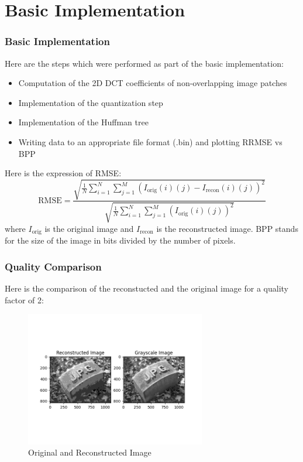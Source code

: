 \documentclass[Serif, 10pt, brown]{beamer}
\theoremstyle{example}
\theoremstyle{plain}
\begin{document}
\section{Basic Implementation}
\begin{frame}
	\frametitle{Basic Implementation}
	Here are the steps which were performed as part of the basic implementation:
	\begin{itemize}
		\item Computation of the 2D DCT coefficients of non-overlapping image patches
		\item Implementation of the quantization step
		\item Implementation of the Huffman tree
		\item Writing data to an appropriate file format (.bin) and plotting RRMSE vs BPP
	\end{itemize}
	Here is the expression of RMSE:
	\begin{equation}
		\text{RMSE} = \frac{\sqrt{\frac{1}{N} \sum_{i=1}^{N}\sum_{j=1}^{M} (I_{\text{orig}}(i)(j) - I_{\text{recon}}(i)(j))^2}}{\sqrt{\frac{1}{N} \sum_{i=1}^{N}\sum_{j=1}^{M} (I_{\text{orig}}(i)(j))^2}}
	\end{equation}
	where $I_{\text{orig}}$ is the original image and $I_{\text{recon}}$ is the reconstructed image. BPP stands for the size of the image in bits divided by the number of pixels.
\end{frame}
\begin{frame}
	\frametitle{Quality Comparison}
	Here is the comparison of the reconstucted and the original image for a quality factor of 2:
	\begin{figure}
		\centering
		\includegraphics[width=0.7\textwidth]{../results/Quality: 2_comparison.png}
		\caption{Original and Reconstructed Image}
	\end{figure}
\end{frame}
\end{document}
